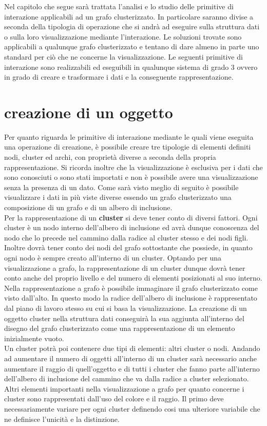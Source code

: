 \large{
Nel capitolo che segue sarà trattata l'analisi e lo studio delle primitive di interazione applicabili ad un grafo clusterizzato. In particolare saranno divise a seconda della tipologia di operazione che si andrà ad eseguire sulla struttura dati o sulla loro visualizzazione mediante l'interazione. Le soluzioni trovate sono applicabili a qualunque grafo clusterizzato e tentano di dare almeno in parte uno standard per ciò che ne concerne la visualizzazione. Le seguenti primitive di interazione sono realizzabili ed eseguibili in qualunque sistema di grado $3$ ovvero in grado di creare e trasformare i dati e la conseguente rappresentazione.
\section{creazione di un oggetto}
Per quanto riguarda le primitive di interazione mediante le quali viene eseguita una operazione di creazione, è possibile creare tre tipologie di elementi definiti nodi, cluster ed archi, con proprietà diverse a seconda della propria rappresentazione. Si ricorda inoltre che la visualizzazione è esclusiva per i dati che sono conosciuti o sono stati importati e non è possibile avere una visualizzazione senza la presenza di un dato. Come sarà visto meglio di seguito è possibile visualizzare i dati in più viste diverse essendo un grafo clusterizzato una composizione di un grafo e di un albero di inclusione.\\
Per la rappresentazione di un \textbf{cluster} si deve tener conto di diversi fattori. Ogni cluster è un nodo interno dell'albero di inclusione ed avrà dunque conoscenza del nodo che lo precede nel cammino dalla radice al cluster stesso e dei nodi figli. Inoltre dovrà tener conto dei nodi del grafo sottostante che possiede, in quanto ogni nodo è sempre creato all'interno di un cluster.
Optando per una visualizzazione a grafo, la rappresentazione di un cluster dunque dovrà tener conto anche del proprio livello e del numero di elementi posizionati al suo interno. 
Nella rappresentazione a grafo è possibile immaginare il grafo clusterizzato come visto dall'alto. In questo modo la radice dell'albero di inclusione è rappresentato dal piano di lavoro stesso su cui si basa la visualizzazione.
La creazione di un oggetto cluster nella struttura dati conseguirà la sua aggiunta all'interno del disegno del grafo clusterizzato come una rappresentazione di un elemento inizialmente vuoto.\\
Un cluster potrà poi contenere due tipi di elementi: altri cluster o nodi. Andando ad aumentare il numero di oggetti all'interno di un cluster sarà necessario anche aumentare il raggio di quell'oggetto e di tutti i cluster che fanno parte all'interno dell'albero di inclusione del cammino che va dalla radice a cluster selezionato. Altri elementi importanti nella visualizzazione a grafo per quanto concerne i cluster sono rappresentati dall'uso del colore e il raggio. Il primo deve necessariamente variare per ogni cluster definendo cosi una ulteriore variabile che ne definisce l'unicità e la distinzione.
}
